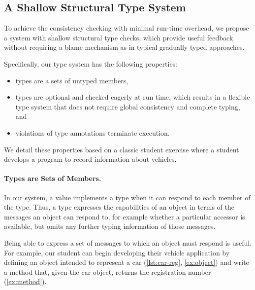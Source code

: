 \subsection{A Shallow Structural Type System}

To achieve the consistency checking with minimal run-time overhead,
we propose a system with shallow structural type checks,
which provide useful feedback without requiring a blame mechanism
as in typical gradually typed approaches.


Specifically, our type system has the following properties:

\begin{itemize}
  \item types are a sets of untyped members,
  \item types are optional and checked eagerly at run time,
        which results in a flexible type system that does not require global
        consistency and complete typing, and
  \item violations of type annotations terminate execution.
\end{itemize}


We detail these properties
based on a classic student exercise where a student develops
a program to record information about vehicles.

\paragraph{Types are Sets of Members.}

In our system, a value implements a type when it
can respond to each member of the type.
Thus, a type expresses the capabilities
of an object in terms of the messages an object
can respond to, for example whether a particular accessor is
available, but omits any further typing information of those messages.

Being able to express a set of messages to which an object
must respond is useful. For example, our student can begin
developing their vehicle application
by defining an object
intended to represent a car (\cref{lst:car-reg}, \cref{ex:object}) and write a method that, 
given the car object,
returns the registration number (\cref{ex:method}).


